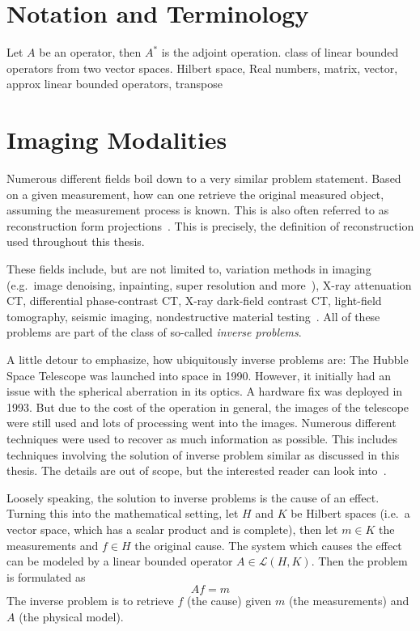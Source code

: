 \chapter{Notation and Terminology}\label{chap:notation}

Let \(A\) be an operator, then \(A^\ast\) is the adjoint operation. class of linear bounded
operators from two vector spaces.
Hilbert space, Real numbers, matrix, vector, approx linear bounded operators, transpose

\chapter{Imaging Modalities}\label{chap:imaging_modalities}

Numerous different fields boil down to a very similar problem statement. Based on a given
measurement, how can one retrieve the original measured object, assuming the measurement process is
known. This is also often referred to as reconstruction form projections~\cite{herman_basis_2015}.
This is precisely, the definition of reconstruction used throughout this thesis.

These fields include, but are not limited to, variation methods in imaging (e.g.\ image denoising,
inpainting, super resolution and more~\cite{scherzer_variational_2009}), X-ray attenuation CT,
differential phase-contrast CT, X-ray dark-field contrast CT, light-field tomography, seismic
imaging, nondestructive material testing~\cite{carpio_inverse_2008}. All of these problems are part
of the class of so-called \textit{inverse problems}.

A little detour to emphasize, how ubiquitously inverse problems are: The Hubble Space Telescope was
launched into space in 1990. However, it initially had an issue with the spherical aberration in its
optics. A hardware fix was deployed in 1993. But due to the cost of the operation in general, the
images of the telescope were still used and lots of processing went into the images. Numerous
different techniques were used to recover as much information as possible. This includes techniques
involving the solution of inverse problem similar as discussed in this thesis. The details are out
of scope, but the interested reader can look into~\cite{white_restoration_1992,adorf_hubble_1995}.

\begin{definition}\label{def:inverse_problem}
	Loosely speaking, the solution to inverse problems is the cause of an effect. Turning this
	into the mathematical setting, let \(H\) and \(K\) be Hilbert spaces (i.e.\ a vector space,
	which has a scalar product and is complete), then let \(m \in K\) the measurements and \(f
	\in H\) the original cause. The system which causes the effect can be modeled by a
	linear bounded operator \(A \in \mathscr{L}(H, K)\). Then the problem is formulated as
	\[ A f = m \]
	The inverse problem is to retrieve \(f\) (the cause) given \(m\) (the measurements) and \(A\)
	(the physical model).
\end{definition}

